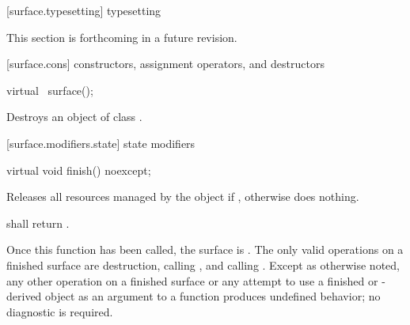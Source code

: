  [surface.typesetting] { typesetting}

\pnum
This section is forthcoming in a future revision.

 [surface.cons] { constructors, assignment operators, and destructors}

\begin{itemdecl}
virtual ~surface();
\end{itemdecl}
\begin{itemdescr}
\pnum
\effects
Destroys an object of class .
\end{itemdescr}

 [surface.modifiers.state] { state modifiers}

\begin{itemdecl}
virtual void finish() noexcept;
\end{itemdecl}
\begin{itemdescr}
\pnum
\effects
Releases all resources managed by the  object  if , otherwise does nothing.

\pnum
\postconditions
{} shall return .

\pnum
\remarks
Once this function has been called, the surface is . The only valid operations on a finished surface are destruction, calling , and calling . Except as otherwise noted, any other operation on a finished surface or any attempt to use a finished  or -derived object as an argument to a function produces undefined behavior; no diagnostic is required.
\end{itemdescr}

